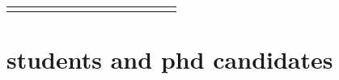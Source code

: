\begin{table}[]
\begin{tabular}{cllllrrrrrrrrrr}
\rowcolor[HTML]{0070C0} 
\multicolumn{1}{l}{\cellcolor[HTML]{0070C0}{\color[HTML]{FFFFFF} \textbf{}}}            &                                                                              &                               &                                       &                                              & \multicolumn{1}{l}{\cellcolor[HTML]{0070C0}}                                         & \multicolumn{1}{l}{\cellcolor[HTML]{0070C0}}              & \multicolumn{1}{l}{\cellcolor[HTML]{0070C0}}             & \multicolumn{1}{l}{\cellcolor[HTML]{0070C0}}                          & \multicolumn{1}{l}{\cellcolor[HTML]{0070C0}}                          & \multicolumn{1}{l}{\cellcolor[HTML]{0070C0}}                           & \multicolumn{1}{l}{\cellcolor[HTML]{0070C0}}                                & {\color[HTML]{FFFFFF} \textbf{}}                                              & {\color[HTML]{FFFFFF} \textbf{}}                                         & {\color[HTML]{FFFFFF} \textbf{}}                                                    
\end{tabular}
\end{table}

\section{students and phd candidates}

